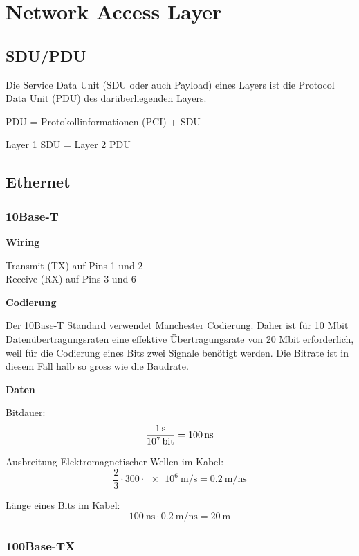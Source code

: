 \section{Network Access Layer}


\subsection{SDU/PDU}

Die Service Data Unit (SDU oder auch Payload) eines Layers ist die Protocol Data
Unit (PDU) des darüberliegenden Layers.

PDU = Protokollinformationen (PCI) + SDU

Layer 1 SDU = Layer 2 PDU


\subsection{Ethernet}

\subsubsection{10Base-T}

\textbf{Wiring}

Transmit (TX) auf Pins 1 und 2\\
Receive (RX) auf Pins 3 und 6

\textbf{Codierung}

Der 10Base-T Standard verwendet Manchester Codierung. Daher ist für 10 Mbit
Datenübertragungsraten eine effektive Übertragungsrate von 20 Mbit erforderlich,
weil für die Codierung eines Bits zwei Signale benötigt werden. Die Bitrate ist
in diesem Fall halb so gross wie die Baudrate.

\textbf{Daten}

Bitdauer:
\[
	\frac{\SI{1}{\second}}{\SI{e7}{\bit}} = \SI{100}{\ns}
\]

Ausbreitung Elektromagnetischer Wellen im Kabel: 
\[
	\frac{2}{3} \cdot 300\cdot \SI{e6}{\meter\per\second} = \SI{0.2}{\meter\per\ns}
\]

Länge eines Bits im Kabel:
\[
	\SI{100}{\ns} \cdot \SI{0.2}{\meter\per\ns} = \SI{20}{\meter}
\]


\subsubsection{100Base-TX}

